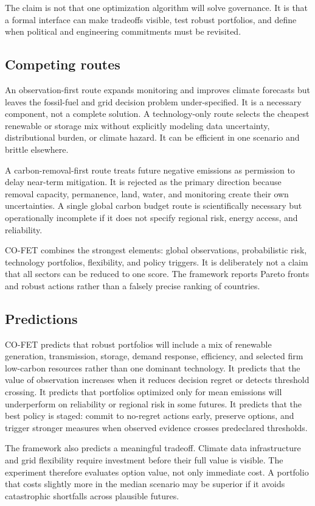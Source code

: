 \documentclass[conference]{IEEEtran}
\begin{document}
The claim is not that one optimization algorithm will solve governance. It is that a formal interface can make tradeoffs visible, test robust portfolios, and define when political and engineering commitments must be revisited.

\subsection{Competing routes}
An observation-first route expands monitoring and improves climate forecasts but leaves the fossil-fuel and grid decision problem under-specified. It is a necessary component, not a complete solution. A technology-only route selects the cheapest renewable or storage mix without explicitly modeling data uncertainty, distributional burden, or climate hazard. It can be efficient in one scenario and brittle elsewhere.

A carbon-removal-first route treats future negative emissions as permission to delay near-term mitigation. It is rejected as the primary direction because removal capacity, permanence, land, water, and monitoring create their own uncertainties. A single global carbon budget route is scientifically necessary but operationally incomplete if it does not specify regional risk, energy access, and reliability.

CO-FET combines the strongest elements: global observations, probabilistic risk, technology portfolios, flexibility, and policy triggers. It is deliberately not a claim that all sectors can be reduced to one score. The framework reports Pareto fronts and robust actions rather than a falsely precise ranking of countries.

\subsection{Predictions}
CO-FET predicts that robust portfolios will include a mix of renewable generation, transmission, storage, demand response, efficiency, and selected firm low-carbon resources rather than one dominant technology. It predicts that the value of observation increases when it reduces decision regret or detects threshold crossing. It predicts that portfolios optimized only for mean emissions will underperform on reliability or regional risk in some futures. It predicts that the best policy is staged: commit to no-regret actions early, preserve options, and trigger stronger measures when observed evidence crosses predeclared thresholds.

The framework also predicts a meaningful tradeoff. Climate data infrastructure and grid flexibility require investment before their full value is visible. The experiment therefore evaluates option value, not only immediate cost. A portfolio that costs slightly more in the median scenario may be superior if it avoids catastrophic shortfalls across plausible futures.
\end{document}
